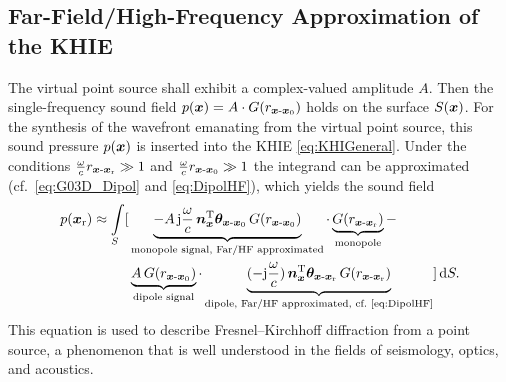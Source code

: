 \subsection{Far-Field/High-Frequency Approximation of the KHIE}

The virtual point source shall exhibit a complex-valued amplitude $A$.
Then the single-frequency sound field $p(\bm{x}) = A \cdot G(r_{\bm{x}\text{-}\bm{x}_\mathrm{0}})$
holds on the surface $S(\bm{x})$.
%
For the synthesis of the wavefront emanating from the virtual point source,
this sound pressure $p(\bm{x})$ is inserted into the KHIE
\myeq\eqref{eq:KHIGeneral}.
%
Under the conditions
$\frac{\omega}{c} r_{\bm{x}\text{-}\bm{x}_\mathrm{r}} \gg 1$ and
$\frac{\omega}{c} r_{\bm{x}\text{-}\bm{x}_\mathrm{0}} \gg 1$
the integrand can be approximated (cf.~\myeq\eqref{eq:G03D_Dipol} and
\eqref{eq:DipolHF}), which yields the sound field
%
\begin{align}
p(\xr) \approx \int\limits_S [
&\underbrace{-A\,
\im\wc\,
\nxT \bm{\theta}_{\xs\text{-}\xp}\,
G(r_{\xs\text{-}\xp})}_{\text{monopole signal, Far/HF approximated}}
%
\cdot \underbrace{G(r_{\xs\text{-}\xr})}_{\text{monopole}}-
\nonumber\\
&\underbrace{A \, G(r_{\xs\text{-}\xp})}_{\text{dipole signal}}
\cdot
\underbrace{(-\im\wc)\,
\nxT \bm{\theta}_{\xs\text{-}\xr}\,
G(r_{\xs\text{-}\xr})}_{\text{dipole, Far/HF approximated, cf.~\eqref{eq:DipolHF}}}
%
]\,\mathrm{d}S.
\end{align}
%
This equation is used to describe Fresnel–Kirchhoff diffraction from
a point source, a phenomenon that is well understood in the fields of
seismology, optics, and acoustics.
